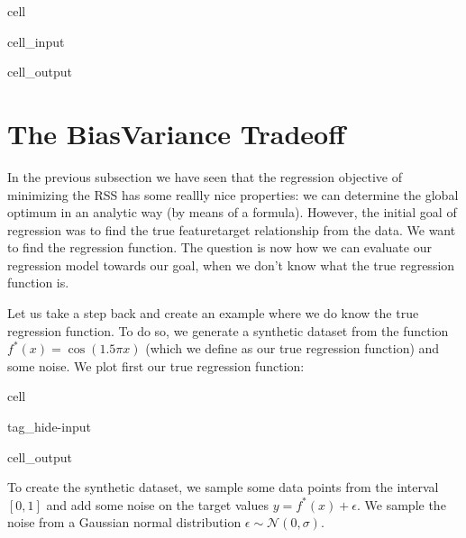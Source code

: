 \documentclass[letterpaper,10pt,english]{jupyterBook}
\begin{document}
\begin{sphinxuseclass}{cell}
\begin{sphinxVerbatimInput}
\begin{sphinxuseclass}{cell_input}
\end{sphinxuseclass}\end{sphinxVerbatimInput}
\begin{sphinxVerbatimOutput}

\begin{sphinxuseclass}{cell_output}
\noindent{}

\end{sphinxuseclass}\end{sphinxVerbatimOutput}

\end{sphinxuseclass}
\sphinxstepscope


\section{The Bias\sphinxhyphen{}Variance Tradeoff}
\label{\detokenize{regression_bias_var:the-bias-variance-tradeoff}}\label{\detokenize{regression_bias_var::doc}}
\sphinxAtStartPar
In the previous subsection we have seen that the regression objective of minimizing the RSS has some reallly nice properties: we can determine the global optimum in an analytic way (by means of a formula). However, the initial goal of regression was to find the true feature\sphinxhyphen{}target relationship from the data. We want to find the  regression function. The question is now how we can evaluate our regression model towards our goal, when we don’t know what the true regression function is.

\sphinxAtStartPar
Let us take a step back and create an example where we do know the true regression function. To do so, we generate  a synthetic dataset from the function \(f^*(x) = \cos(1.5\pi x)\) (which we define as our true regression function) and some noise. We plot first our true regression function:

\begin{sphinxuseclass}{cell}
\begin{sphinxuseclass}{tag_hide-input}\begin{sphinxVerbatimOutput}

\begin{sphinxuseclass}{cell_output}
\noindent{}

\end{sphinxuseclass}\end{sphinxVerbatimOutput}

\end{sphinxuseclass}
\end{sphinxuseclass}
\sphinxAtStartPar
To create the synthetic dataset, we sample some data points from the interval \([0,1]\) and add some noise on the target values \(y= f^*(x)+\epsilon\). We sample the noise from a Gaussian normal distribution \(\epsilon\sim\mathcal{N}(0,\sigma)\).
\end{document}
